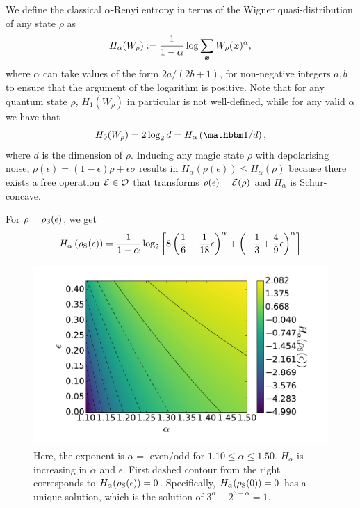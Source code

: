 \documentclass[pra,
aps,
twocolumn,
superscriptaddress,
groupedaddress,
nofootinbib,
reprint
]{revtex4-1}
\begin{document}

We define the classical $\alpha$-Renyi entropy in terms of the Wigner quasi-distribution of any state $\rho$ as
\begin{equation}
	H_\alpha(W_\rho) := \frac{1}{1-\alpha} \log \sum_{\bm{x}} W_{\rho}(\bm{x})^\alpha,
\end{equation}
where $\alpha$ can take values of the form $2a / (2b+1)$, for non-negative integers $a,b$ to ensure that the argument of the logarithm is positive.
Note that for any quantum state $\rho$, $H_1(W_\rho)$ in particular is not well-defined, while for any valid $\alpha$ we have that
\begin{equation}
	H_0(W_\rho) = 2\log_2 d = H_\alpha \left( \id/d \right),
\end{equation}
where $d$ is the dimension of $\rho$.
Inducing any magic state $\rho$ with depolarising noise, $\rho(\epsilon) = (1-\epsilon)\rho + \epsilon \sigma$ results in $H_{\alpha}\left(\rho(\epsilon)\right) \leq H_\alpha(\rho)$ because there exists a free operation ${\mathcal E} \in {\mathcal O}$ that transforms $\rho(\epsilon) = {\mathcal E}(\rho)$ and $H_\alpha$ is Schur-concave.

For $\rho = \rho_{\rm{S}}(\epsilon)$, we get
\begin{equation}
	H_{\alpha}\left(\rho_{\rm{S}}(\epsilon)\right) = \frac{1}{1-\alpha}\log_2 \left[ 8\left( \frac{1}{6} - \frac{1}{18}\epsilon \right)^\alpha + \left(-\frac{1}{3} + \frac{4}{9}\epsilon \right)^\alpha \right]
\end{equation}

\begin{figure}[h]
    \centering
    \includegraphics[scale=0.35]{figs/test/H_vs_eps_a.pdf}
    \caption{\ddd{[TO DO: Set $\epsilon = 0$ and determine region of $\alpha$ such that $H <0$.]} Here, the exponent is $\alpha =$ even$/$odd for $1.10 \leq \alpha \leq 1.50$. $H_\alpha$ is increasing in $\alpha$ and $\epsilon$. First dashed contour from the right corresponds to $H_\alpha(\rho_{\rm{S}}(\epsilon)) = 0$. Specifically, $H_\alpha(\rho_{\rm{S}}(0)) = 0$ has a unique solution, which is the  solution of $3^\alpha - 2^{3-\alpha} = 1$.
    }
    \label{fig:H}
\end{figure}
\end{document}

